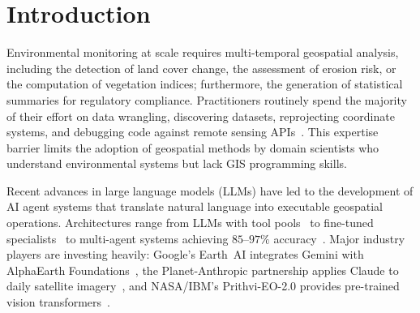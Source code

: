 \documentclass[sigconf]{acmart}
\begin{document}

\maketitle

\renewcommand{\thefootnote}{}%
%
\renewcommand{\thefootnote}{\arabic{footnote}}%

\makeatletter
\fancyhead[LE]{\ACM@linecountL\@headfootfont\acmConference@shortname}%
\fancyhead[RO]{\@headfootfont\acmConference@shortname\ACM@linecountR}%
\makeatother

\section{Introduction}
\label{sec:intro}

Environmental monitoring at scale requires multi-temporal geospatial analysis, including the detection of land cover change, the assessment of erosion risk, or the computation of vegetation indices; furthermore, the generation of statistical summaries for regulatory compliance. Practitioners routinely spend the majority of their effort on data wrangling, discovering datasets, reprojecting coordinate systems, and debugging code against remote sensing APIs~\cite{zhang2023geogpt, li2023llmgeo}. This expertise barrier limits the adoption of geospatial methods by domain scientists who understand environmental systems but lack GIS programming skills.

Recent advances in large language models (LLMs) have led to the development of AI agent systems that translate natural language into executable geospatial operations. Architectures range from LLMs with tool pools~\citep{zhang2023geogpt, akinboyewa2024giscopilot} to fine-tuned specialists~\citep{zhang2024gtchain, zhang2025envgpt} to multi-agent systems achieving $85$--$97\%$ accuracy~\citep{luo2025geojsonagents, lee2025geollmsquad}. Major industry players are investing heavily: Google's Earth~AI integrates Gemini with AlphaEarth Foundations~\citep{google2025earthai}, the Planet-Anthropic partnership applies Claude to daily satellite imagery~\citep{planet2025anthropic}, and NASA/IBM's Prithvi-EO-2.0 provides pre-trained vision transformers~\citep{szwarcman2024prithvi}.
\end{document}
